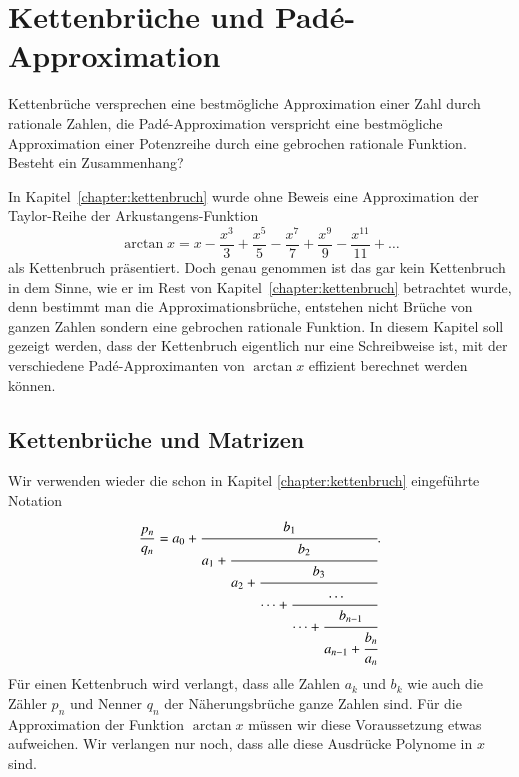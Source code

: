 %
%
%
\chapter{Kettenbrüche und Padé-Approximation\label{chapter:arctan}}
\begin{refsection}

{\parindent0pt
Kettenbrüche} versprechen eine bestmögliche Approximation einer Zahl durch
rationale Zahlen, die Padé-Approximation verspricht eine bestmögliche
Approximation einer Potenzreihe durch eine gebrochen rationale Funktion.
Besteht ein Zusammenhang?

In Kapitel~\ref{chapter:kettenbruch} wurde ohne Beweis eine Approximation der 
Taylor-Reihe der Arkustangens-Funktion
\begin{equation}
\arctan x
=
x-\frac{x^3}{3}+\frac{x^5}{5}-\frac{x^7}{7}+\frac{x^9}{9}-\frac{x^{11}}{11}
+\dots
\label{arctan:arctan}
\end{equation}
als Kettenbruch präsentiert.
Doch genau genommen ist das gar kein Kettenbruch in dem Sinne, wie er
im Rest von Kapitel~\ref{chapter:kettenbruch} betrachtet wurde, denn
bestimmt man die Approximationsbrüche, entstehen nicht Brüche von ganzen
Zahlen sondern eine gebrochen rationale Funktion.
In diesem Kapitel soll gezeigt werden, dass der Kettenbruch eigentlich
nur eine Schreibweise ist, mit der verschiedene Padé-Approximanten von
$\arctan x$ effizient berechnet werden können.

\section{Kettenbrüche und Matrizen
\label{arctan:section:matrizen}}
Wir verwenden wieder die schon in Kapitel \ref{chapter:kettenbruch}
eingeführte Notation
\[
\frac{p_n}{q_n}
=
a_0 +
\cfrac{b_1}{
a_1+\cfrac{b_2}{
a_2+\cfrac{b_3}{
\dots+\cfrac{\dots}{\dots+\cfrac{b_{n-1}}{a_{n-1}+\cfrac{b_n}{a_n}}}}}}.
\]
Für einen Kettenbruch wird verlangt, dass alle Zahlen $a_k$ und $b_k$ 
wie auch die Zähler $p_n$ und Nenner $q_n$ der Näherungsbrüche
ganze Zahlen sind.
Für die Approximation der Funktion $\arctan x$ müssen wir
diese Voraussetzung etwas aufweichen.
Wir verlangen nur noch, dass alle diese Ausdrücke Polynome in $x$ sind.


\end{refsection}
